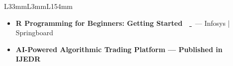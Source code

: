 \documentclass[10pt]{article}
\begin{document}
{\begin{tabular}{L{33mm}L{3mm}L{154mm}}
{\begin{itemize}[topsep=1pt, itemsep=1pt]
\item \textbf{R Programming for Beginners: Getting Started}~~\href{https://verify.onwingspan.com/}{\color{black} \faExternalLink}~--- Infosys | Springboard



\item \textbf{AI-Powered Algorithmic Trading Platform — Published in IJEDR}~~\href{https://rjwave.org/ijedr/viewpaperforall.php?paper=IJEDR2601221}{\color{black} \faExternalLink}

\end{itemize}
}
\end{tabular}
}
\end{document}
